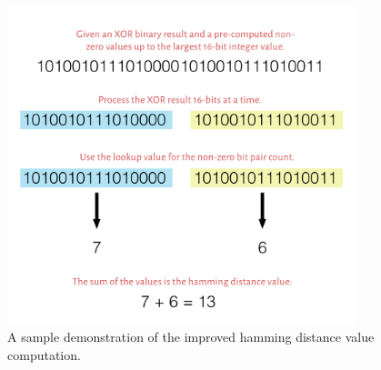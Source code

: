 \begin{figure}[h]
	\centering
	\includegraphics[width=4.0in]{contents/00_images/usage-improved-hd}\vspace*{5pt}
	
	\caption{A sample demonstration of the improved hamming distance value computation.}
	\label{fig:usage-improved-hd}
\end{figure}